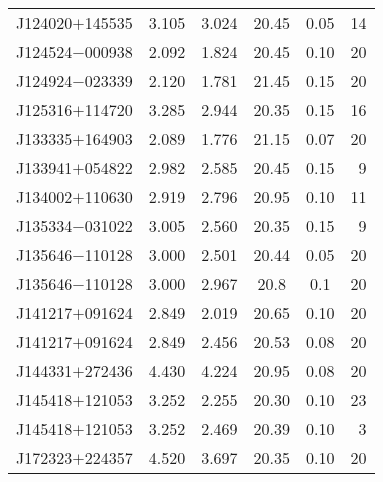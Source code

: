\begin{table}
\begin{center}
{\begin{tabular}{lccccr}
 J124020$+$145535 &      3.105 &                    3.024 &                   20.45 &               0.05 &                14 \\
 J124524$-$000938 &      2.092 &                    1.824 &                   20.45 &               0.10 &                20 \\
 J124924$-$023339 &      2.120 &                    1.781 &                   21.45 &               0.15 &                20 \\
 J125316$+$114720 &      3.285 &                    2.944 &                   20.35 &               0.15 &                16 \\
 J133335$+$164903 &      2.089 &                    1.776 &                   21.15 &               0.07 &                20 \\
 J133941$+$054822 &      2.982 &                    2.585 &                   20.45 &               0.15 &                 9 \\
 J134002$+$110630 &      2.919 &                    2.796 &                   20.95 &               0.10 &                11 \\
 J135334$-$031022 &      3.005 &                    2.560 &                   20.35 &               0.15 &                 9 \\
 J135646$-$110128 &      3.000 &                    2.501 &                   20.44 &               0.05 &                20 \\
 J135646$-$110128 &      3.000 &                    2.967 &                   20.8  &               0.1  &                20 \\
 J141217$+$091624 &      2.849 &                    2.019 &                   20.65 &               0.10 &                20 \\
 J141217$+$091624 &      2.849 &                    2.456 &                   20.53 &               0.08 &                20 \\
 J144331$+$272436 &      4.430 &                    4.224 &                   20.95 &               0.08 &                20 \\
 J145418$+$121053 &      3.252 &                    2.255 &                   20.30 &               0.10 &                23 \\
 J145418$+$121053 &      3.252 &                    2.469 &                   20.39 &               0.10 &                3  \\
 J172323$+$224357 &      4.520 &                    3.697 &                   20.35 &               0.10 &                20 \\

\end{tabular}}
\end{center}
\end{table}
